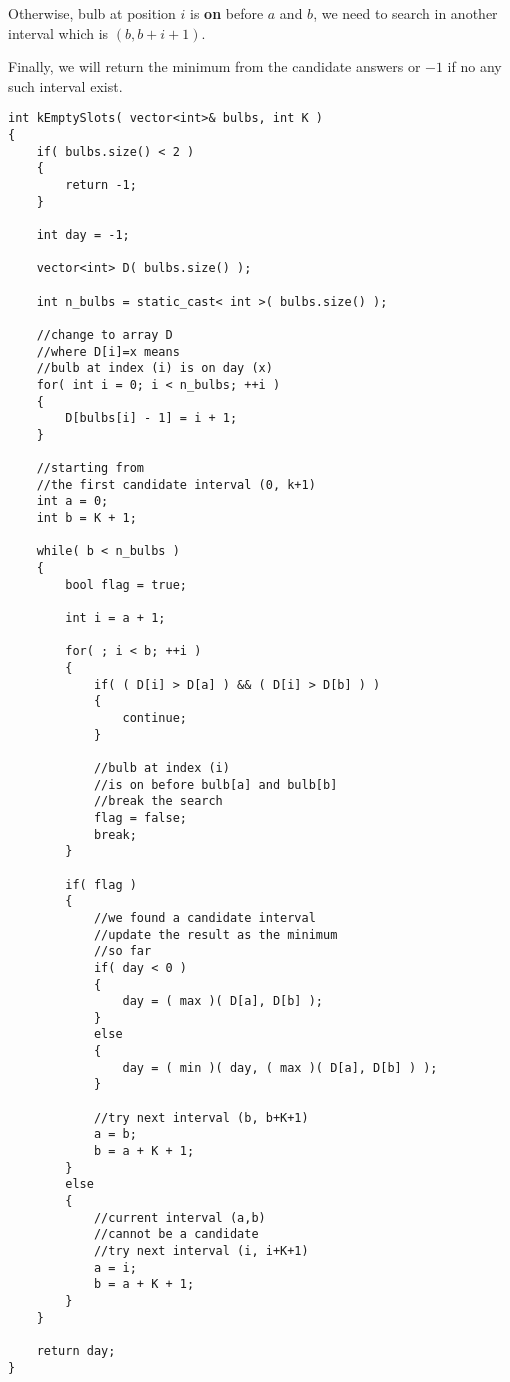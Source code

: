 Otherwise, bulb at position $i$ is \textbf{on} before $a$ and $b$, we need to search in another interval which is $(b, b+i+1)$.

Finally, we will return the minimum from the candidate answers or $-1$ if no any such interval exist.

\begin{lstlisting}[style=customc, caption={Sliding Window}]
int kEmptySlots( vector<int>& bulbs, int K )
{
    if( bulbs.size() < 2 )
    {
        return -1;
    }

    int day = -1;

    vector<int> D( bulbs.size() );

    int n_bulbs = static_cast< int >( bulbs.size() );

    //change to array D
    //where D[i]=x means
    //bulb at index (i) is on day (x)
    for( int i = 0; i < n_bulbs; ++i )
    {
        D[bulbs[i] - 1] = i + 1;
    }

    //starting from
    //the first candidate interval (0, k+1)
    int a = 0;
    int b = K + 1;

    while( b < n_bulbs )
    {
        bool flag = true;

        int i = a + 1;

        for( ; i < b; ++i )
        {
            if( ( D[i] > D[a] ) && ( D[i] > D[b] ) )
            {
                continue;
            }

            //bulb at index (i)
            //is on before bulb[a] and bulb[b]
            //break the search
            flag = false;
            break;
        }

        if( flag )
        {
            //we found a candidate interval
            //update the result as the minimum
            //so far
            if( day < 0 )
            {
                day = ( max )( D[a], D[b] );
            }
            else
            {
                day = ( min )( day, ( max )( D[a], D[b] ) );
            }

            //try next interval (b, b+K+1)
            a = b;
            b = a + K + 1;
        }
        else
        {
            //current interval (a,b)
            //cannot be a candidate
            //try next interval (i, i+K+1)
            a = i;
            b = a + K + 1;
        }
    }

    return day;
}
\end{lstlisting}